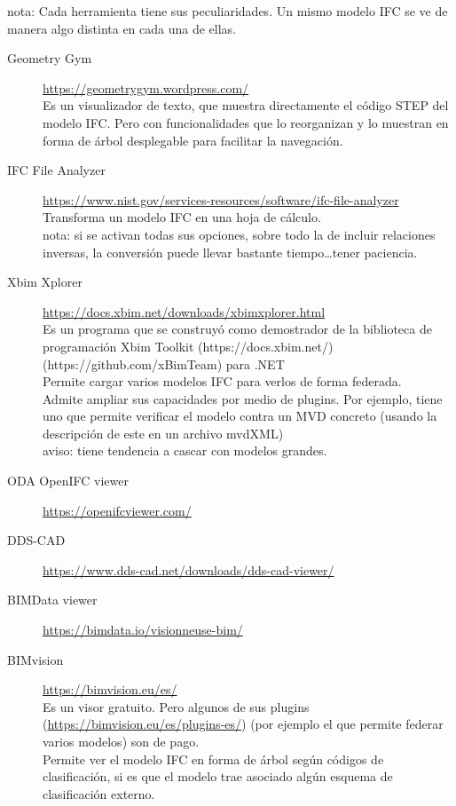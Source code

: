\documentclass[spanish,10pt,a4paper,final,oneside]{article}
\begin{document}
nota: Cada herramienta tiene sus peculiaridades. Un mismo modelo IFC se ve de manera algo distinta en cada una de ellas.

\begin{description}

\item[Geometry Gym]
\url{https://geometrygym.wordpress.com/}
\\Es un visualizador de texto, que muestra directamente el código STEP del modelo IFC. Pero con funcionalidades que lo reorganizan y lo muestran en forma de árbol desplegable para facilitar la navegación.

\item[IFC File Analyzer]
\url{https://www.nist.gov/services-resources/software/ifc-file-analyzer}
\\Transforma un modelo IFC en una hoja de cálculo.
\\nota: si se activan todas sus opciones, sobre todo la de incluir relaciones inversas, la conversión puede llevar bastante tiempo\ldots tener paciencia.

\item[Xbim Xplorer]
\url{https://docs.xbim.net/downloads/xbimxplorer.html}
\\Es un programa que se construyó como demostrador de la biblioteca de programación Xbim Toolkit (https://docs.xbim.net/) (https://github.com/xBimTeam) para .NET
\\Permite cargar varios modelos IFC para verlos de forma federada.
\\Admite ampliar sus capacidades por medio de plugins. Por ejemplo, tiene uno que permite verificar el modelo contra un MVD concreto ({\footnotesize usando la descripción de este en un archivo mvdXML})
\\aviso: tiene tendencia a cascar con modelos grandes.

\item[ODA OpenIFC viewer]
\url{https://openifcviewer.com/}

\item[DDS-CAD]
\url{https://www.dds-cad.net/downloads/dds-cad-viewer/}

\item[BIMData viewer]
\url{https://bimdata.io/visionneuse-bim/}

\item[BIMvision]
\url{https://bimvision.eu/es/}
\\Es un visor gratuito. Pero algunos de sus plugins (\url{https://bimvision.eu/es/plugins-es/}) (por ejemplo el que permite federar varios modelos) son de pago.
\\Permite ver el modelo IFC en forma de árbol según códigos de clasificación, si es que el modelo trae asociado algún esquema de clasificación externo.


\end{description}
\end{document}
